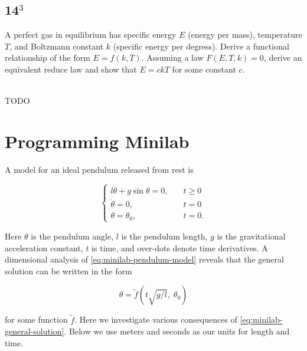 \documentclass[12pt]{article}
\begin{document}
\subsection{14$^3$}
\begin{Ex}
  A perfect gas in equilibrium has specific energy $E$ (energy per mass),
  temperature $T$, and Boltzmann constant $k$ (specific energy per degress).
  Derive a functional relationship of the form $E=f(k,T)$. Assuming a law
  $F(E,T,k)=0$, derive an equivalent reduce law and show that $E=ckT$ for some
  constant $c$.
  \begin{solution} \hfill \vspace{.75em} \\
    {\huge \color{red}TODO}
  \end{solution}
\end{Ex}

\section{Programming Minilab}
A model for an ideal pendulum released from rest is

\begin{equation}
  \label{eq:minilab-pendulum-model}
   \left\{
  \begin{aligned}
    l\ddot{\theta}+g\sin\theta = 0, \quad & t\ge0 \\
    \dot{\theta} = 0, \quad & t = 0 \\
    \theta = \theta_0, \quad & t = 0.
  \end{aligned}\right.
\end{equation}

Here $\theta$ is the pendulum angle, $l$ is the pendulum length, $g$ is the
gravitational acceleration constant, $t$ is time, and over-dots denote time
derivatives. A dimensional analysis of \cref{eq:minilab-pendulum-model} reveals
that the general solution can be written in the form

\begin{equation}
  \label{eq:minilab-general-solution}
  \theta = \tilde{f}(t\sqrt{g/l}, \;\theta_0)
\end{equation}

for some function $\tilde{f}$. Here we investigate various consequences of
\cref{eq:minilab-general-solution}. Below we use meters and seconds as our units
for length and time.
\end{document}

